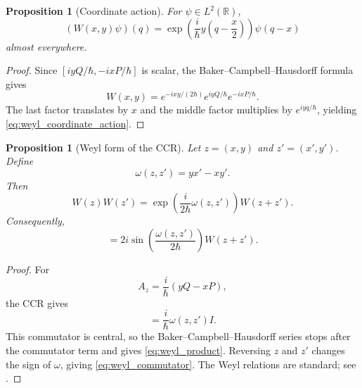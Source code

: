 \documentclass[11pt]{amsart}
\numberwithin{equation}{section}
\theoremstyle{plain}
\newtheorem{proposition}[theorem]{Proposition}
\theoremstyle{definition}
\theoremstyle{remark}
\newcommand{\R}{\mathbb{R}}
\begin{document}
\begin{proposition}[Coordinate action]
\label{prop:weyl_coordinate_action}
For $\psi\in L^2(\R)$,
\begin{equation}
(W(x,y)\psi)(q)
=
\exp\!\left(\frac{i}{\hbar}y\left(q-\frac{x}{2}\right)\right)
\psi(q-x)
\label{eq:weyl_coordinate_action}
\end{equation}
almost everywhere.
\end{proposition}

\begin{proof}
Since $[iyQ/\hbar,-ixP/\hbar]$ is scalar, the Baker--Campbell--Hausdorff
formula gives
\begin{equation}
W(x,y)
=
e^{-ixy/(2\hbar)}e^{iyQ/\hbar}e^{-ixP/\hbar}.
\label{eq:weyl_BCH_factorization}
\end{equation}
The last factor translates by $x$ and the middle factor multiplies by
$e^{iyq/\hbar}$, yielding \eqref{eq:weyl_coordinate_action}.
\end{proof}

\begin{proposition}[Weyl form of the CCR]
\label{prop:weyl_relation}
Let $z=(x,y)$ and $z'=(x',y')$.  Define
\begin{equation}
\omega(z,z')=yx'-xy'.
\label{eq:symplectic_form}
\end{equation}
Then
\begin{equation}
W(z)W(z')
=
\exp\!\left(\frac{i}{2\hbar}\omega(z,z')\right)
W(z+z').
\label{eq:weyl_product}
\end{equation}
Consequently,
\begin{equation}
[W(z),W(z')]
=
2i\sin\!\left(\frac{\omega(z,z')}{2\hbar}\right)W(z+z').
\label{eq:weyl_commutator}
\end{equation}
\end{proposition}

\begin{proof}
For
\begin{equation}
A_z=\frac{i}{\hbar}(yQ-xP),
\label{eq:Az_definition}
\end{equation}
the CCR gives
\begin{equation}
[A_z,A_{z'}]
=
\frac{i}{\hbar}\omega(z,z')I.
\label{eq:Az_commutator}
\end{equation}
This commutator is central, so the Baker--Campbell--Hausdorff series stops
after the commutator term and gives \eqref{eq:weyl_product}.  Reversing $z$
and $z'$ changes the sign of $\omega$, giving \eqref{eq:weyl_commutator}.
The Weyl relations are standard; see \cite{Folland1989}.
\end{proof}
\end{document}
